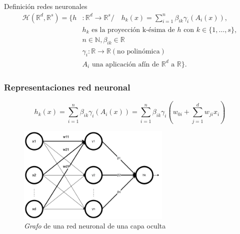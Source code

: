 \documentclass{beamer}
\newcommand{\R}{\mathbb{R}}
\newcommand{\N}{\mathbb{N}}
\begin{document}
\begin{frame}{Definición redes neuronales}
    \pause
    \begin{align*}
        \mathcal{H}(\R^d,\R^s) 
            =
            \{
                h &: \R^d \longrightarrow \R^s 
                 /\quad 
                h_k(x) = 
                \sum_{i=1}^{n} \beta_{i k} \gamma_{i}( A_{i}(x)), \\
                & \text{$h_k$  es la proyección k-ésima de $h$ con 
                $k \in \{1, \ldots, s\}$}, \\
                & n \in \N, \beta_{i k} \in \R \\
                &\gamma_{i} : \R \longrightarrow \R (\text{no polinómica}) \\
                &A_{i} \text{ una aplicación afín de $\R^d$ a $\R$}           
            \}.
    \end{align*}
\end{frame}
\begin{frame}
    \frametitle{Representaciones red neuronal}
    \begin{equation*}
        h_k(x) =  \sum_{i=1}^{n} \beta_{i k} \gamma_{i}( A_{i}(x))
        = 
        \sum_{i=1}^{n} \beta_{i k} \gamma_{i}
        \left(
            w_{0 i} + \sum_{j=1}^d w_{j i } x_i
        \right) 
    \end{equation*}
    \begin{figure}[h!]
        \centering
        \includegraphics[width=0.65\textwidth]{1-Introduccion_redes_neuronales/Red-Neuronal-una-capa-simple.png}
        \caption{\textit{Grafo} de una red neuronal de una capa oculta}
        \label{img:grafo-red-neuronal-una-capa-oculta_repeticion}
    \end{figure}

\end{frame}
\end{document}

